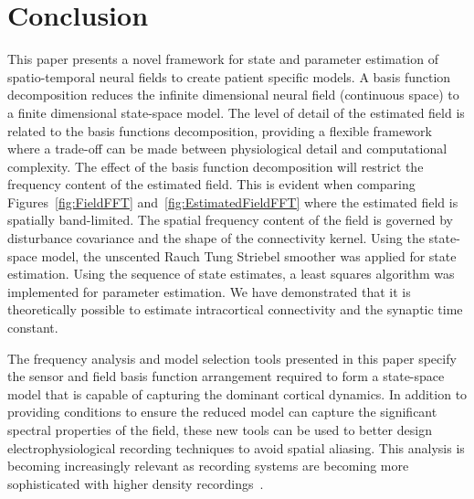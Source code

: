 \documentclass[10pt,a4paper]{article}
\begin{document}
\section{Conclusion}
This paper presents a novel framework for state and parameter estimation of spatio-temporal neural fields to create patient specific models. A basis function decomposition reduces the infinite dimensional neural field (continuous space) to a finite dimensional state-space model. The level of detail of the estimated field is related to the basis functions decomposition, providing a flexible framework where a trade-off can be made between physiological detail and computational complexity. The effect of the basis function decomposition will restrict the frequency content of the estimated field. This is evident when comparing Figures~\ref{fig:FieldFFT} and~\ref{fig:EstimatedFieldFFT} where the estimated field is spatially band-limited. The spatial frequency content of the field is governed by disturbance covariance and the shape of the connectivity kernel. Using the state-space model, the unscented Rauch Tung Striebel smoother was applied for state estimation. Using the sequence of state estimates, a least squares algorithm was implemented for parameter estimation. We have demonstrated that it is theoretically possible to estimate intracortical connectivity and the synaptic time constant.  

The frequency analysis and model selection tools presented in this paper specify the sensor and field basis function arrangement required to form a state-space model that is capable of capturing the dominant cortical dynamics. In addition to providing conditions to ensure the reduced model can capture the significant spectral properties of the field, these new tools can be used to better design electrophysiological recording techniques to avoid spatial aliasing. This analysis is becoming increasingly relevant as recording systems are becoming more sophisticated with higher density recordings~\cite{Brinkmann2009}. 
\end{document}
